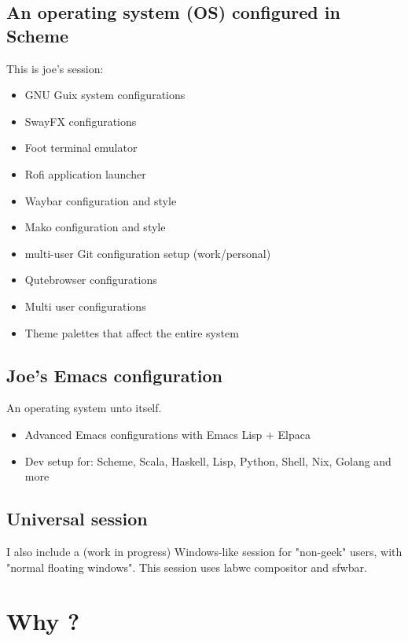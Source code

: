 \documentclass[11pt]{article}
\begin{document}
\subsection{An operating system (OS) configured in Scheme}
\label{sec:orgf5a7ff0}

This is joe's session:

\begin{itemize}
\item GNU Guix system configurations
\item SwayFX configurations
\item Foot terminal emulator
\item Rofi application launcher
\item Waybar configuration and style
\item Mako configuration and style
\item multi-user Git configuration setup (work/personal)
\item Qutebrowser configurations
\item Multi user configurations
\item Theme palettes that affect the entire system
\end{itemize}

\subsection{Joe's Emacs configuration}
\label{sec:orge3eb2f7}

An operating system unto itself.

\begin{itemize}
\item Advanced Emacs configurations with Emacs Lisp + Elpaca
\item Dev setup for: Scheme, Scala, Haskell, Lisp, Python, Shell, Nix, Golang and more
\end{itemize}

\subsection{Universal session}
\label{sec:org1f91c62}

I also include a (work in progress) Windows-like session for "non-geek" users, with "normal floating windows".
This session uses labwc compositor and sfwbar.

\section{Why ?}
\label{sec:orgcb30b1d}
\end{document}
